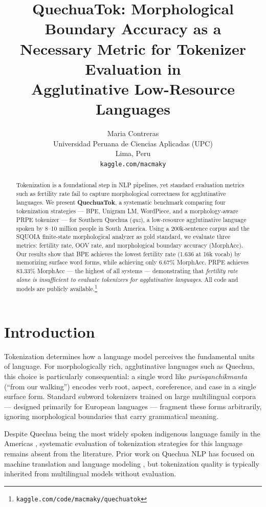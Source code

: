 \documentclass[11pt]{article}
\title{QuechuaTok: Morphological Boundary Accuracy as a\\
Necessary Metric for Tokenizer Evaluation in\\
Agglutinative Low-Resource Languages}
\author{
  Maria Contreras \\
  Universidad Peruana de Ciencias Aplicadas (UPC) \\
  Lima, Peru \\
  \texttt{kaggle.com/macmaky}
}
\begin{document}
\maketitle

\begin{abstract}
Tokenization is a foundational step in NLP pipelines, yet standard evaluation metrics such as fertility rate fail to capture morphological correctness for agglutinative languages. We present \textbf{QuechuaTok}, a systematic benchmark comparing four tokenization strategies --- BPE, Unigram LM, WordPiece, and a morphology-aware PRPE tokenizer --- for Southern Quechua (\textit{quz}), a low-resource agglutinative language spoken by 8--10 million people in South America. Using a 200k-sentence corpus and the SQUOIA finite-state morphological analyzer \cite{rios2016} as gold standard, we evaluate three metrics: fertility rate, OOV rate, and morphological boundary accuracy (MorphAcc). Our results show that BPE achieves the lowest fertility rate (1.636 at 16k vocab) by memorizing surface word forms, while achieving only 6.67\% MorphAcc. PRPE achieves 83.33\% MorphAcc --- the highest of all systems --- demonstrating that \textit{fertility rate alone is insufficient to evaluate tokenizers for agglutinative languages}. All code and models are publicly available.\footnote{\texttt{kaggle.com/code/macmaky/quechuatok}}
\end{abstract}

\section{Introduction}

Tokenization determines how a language model perceives the fundamental units of language. For morphologically rich, agglutinative languages such as Quechua, this choice is particularly consequential: a single word like \textit{purisqanchikmanta} (``from our walking'') encodes verb root, aspect, coreference, and case in a single surface form. Standard subword tokenizers trained on large multilingual corpora --- designed primarily for European languages --- fragment these forms arbitrarily, ignoring morphological boundaries that carry grammatical meaning.

Despite Quechua being the most widely spoken indigenous language family in the Americas \cite{adelaar2004}, systematic evaluation of tokenization strategies for this language remains absent from the literature. Prior work on Quechua NLP has focused on machine translation \cite{oncevay2021} and language modeling \cite{zevallos2022}, but tokenization quality is typically inherited from multilingual models without evaluation.
\end{document}
